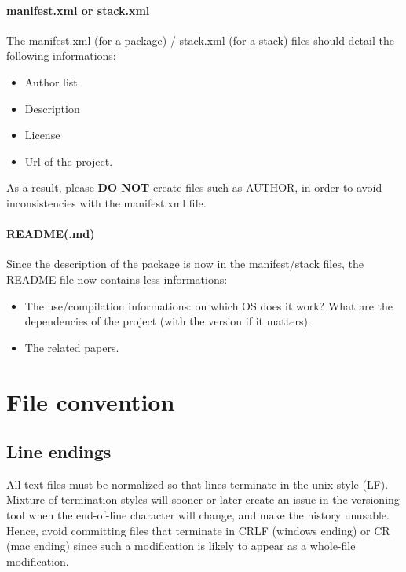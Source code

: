 \paragraph{manifest.xml or stack.xml}
The manifest.xml (for a package) / stack.xml (for a stack) files should detail the following informations:
\begin{itemize}[noitemsep,topsep=0pt,parsep=0pt,partopsep=0pt]
\item Author list
\item Description
\item License
\item Url of the project.
\end{itemize}

As a result, please \textbf{DO NOT} create files such as AUTHOR, in order to avoid inconsistencies with the manifest.xml file.

\paragraph{README(.md)}
Since the description of the package is now in the manifest/stack files, the README file now contains less informations:
\begin{itemize}[noitemsep,topsep=0pt,parsep=0pt,partopsep=0pt]
\item The use/compilation informations: on which OS does it work? What are the dependencies of the project (with the version if it matters).
\item The related papers.
\end{itemize}


\section{File convention}


\subsection{Line endings}
All text files must be normalized so that lines terminate in the unix style (LF).
Mixture of termination styles will sooner or later create an issue in the versioning tool when the end-of-line character will change, and make the history unusable.
Hence, avoid committing files that terminate in CRLF (windows ending) or CR (mac ending) since such a modification is likely to appear as a whole-file modification.


